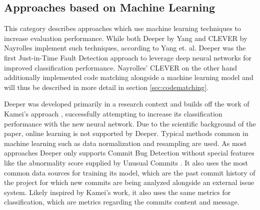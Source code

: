 

\subsection{Approaches based on Machine Learning}
\label{sec:comparison-ml}

This category describes approaches which use machine learning techniques to increase evaluation performance.
While both Deeper by Yang \cite{Yang2015} and CLEVER by Nayrolles \cite{Nayrolles2018} implement such techniques, according to Yang et. al. Deeper was the first Just-in-Time Fault Detection approach to leverage deep neural networks for improved classification performance. Nayrolles' CLEVER on the other hand additionally implemented code matching alongside a machine learning model and will thus be described in more detail in section \ref{sec:codematching}.

Deeper was developed primarily in a research context and builds off the work of Kamei's approach \cite{Kamei2013}, successfully attempting to increase its classification performance with the new neural network. Due to the scientific background of the paper, online learning is not supported by Deeper. Typical methods common in machine learning such as data normalization and resampling are used. As most approaches Deeper only supports Commit Bug Detection without special features like the abnormality score supplied by Unusual Commits \cite{Goyal2017}. It also uses the most common data sources for training its model, which are the past commit history of the project for which new commits are being analyzed alongside an external issue system. Likely inspired by Kamei's work, it also uses the same metrics for classification, which are metrics regarding the commits content and message. 

